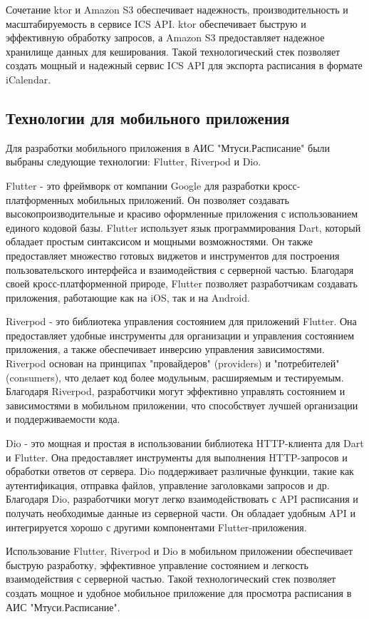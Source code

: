 Сочетание ktor и Amazon S3 обеспечивает надежность, производительность и масштабируемость в сервисе ICS API.
ktor обеспечивает быструю и эффективную обработку запросов, а Amazon S3 предоставляет надежное хранилище данных для кеширования.
Такой технологический стек позволяет создать мощный и надежный сервис ICS API для экспорта расписания в формате iCalendar.

\subsection{Технологии для мобильного приложения}

Для разработки мобильного приложения в АИС "Мтуси.Расписание" были выбраны следующие технологии: Flutter, Riverpod и Dio.

Flutter - это фреймворк от компании Google для разработки кросс-платформенных мобильных приложений.
Он позволяет создавать высокопроизводительные и красиво оформленные приложения с использованием единого кодовой базы.
Flutter использует язык программирования Dart, который обладает простым синтаксисом и мощными возможностями.
Он также предоставляет множество готовых виджетов и инструментов для построения пользовательского интерфейса
и взаимодействия с серверной частью. Благодаря своей кросс-платформенной природе,
Flutter позволяет разработчикам создавать приложения, работающие как на iOS, так и на Android.

Riverpod - это библиотека управления состоянием для приложений Flutter.
Она предоставляет удобные инструменты для организации и управления состоянием приложения,
а также обеспечивает инверсию управления зависимостями.
Riverpod основан на принципах "провайдеров" (providers) и "потребителей" (consumers),
что делает код более модульным, расширяемым и тестируемым. Благодаря Riverpod,
разработчики могут эффективно управлять состоянием и зависимостями в мобильном приложении,
что способствует лучшей организации и поддерживаемости кода.

Dio - это мощная и простая в использовании библиотека HTTP-клиента для Dart и Flutter.
Она предоставляет инструменты для выполнения HTTP-запросов и обработки ответов от сервера.
Dio поддерживает различные функции, такие как аутентификация, отправка файлов,
управление заголовками запросов и др. Благодаря Dio, разработчики могут легко взаимодействовать
с API расписания и получать необходимые данные из серверной части.
Он обладает удобным API и интегрируется хорошо с другими компонентами Flutter-приложения.

Использование Flutter, Riverpod и Dio в мобильном приложении обеспечивает быструю разработку,
эффективное управление состоянием и легкость взаимодействия с серверной частью.
Такой технологический стек позволяет создать мощное и удобное мобильное приложение для просмотра расписания в АИС "Мтуси.Расписание".

